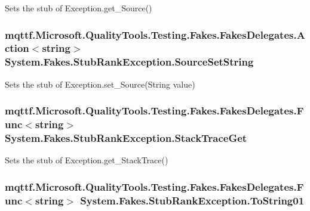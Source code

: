 Sets the stub of Exception.\-get\-\_\-\-Source()

\hypertarget{class_system_1_1_fakes_1_1_stub_rank_exception_a36cd64c088de5c335daa5c4a9218e21d}{
\subsubsection[{Source\-Set\-String}]{\setlength{\rightskip}{0pt plus 5cm}mqttf.\-Microsoft.\-Quality\-Tools.\-Testing.\-Fakes.\-Fakes\-Delegates.\-Action$<$string$>$ System.\-Fakes.\-Stub\-Rank\-Exception.\-Source\-Set\-String}}\label{class_system_1_1_fakes_1_1_stub_rank_exception_a36cd64c088de5c335daa5c4a9218e21d}


Sets the stub of Exception.\-set\-\_\-\-Source(\-String value)

\hypertarget{class_system_1_1_fakes_1_1_stub_rank_exception_aae32a77c0bd8aad21c423ce16c391742}{
\subsubsection[{Stack\-Trace\-Get}]{\setlength{\rightskip}{0pt plus 5cm}mqttf.\-Microsoft.\-Quality\-Tools.\-Testing.\-Fakes.\-Fakes\-Delegates.\-Func$<$string$>$ System.\-Fakes.\-Stub\-Rank\-Exception.\-Stack\-Trace\-Get}}\label{class_system_1_1_fakes_1_1_stub_rank_exception_aae32a77c0bd8aad21c423ce16c391742}


Sets the stub of Exception.\-get\-\_\-\-Stack\-Trace()

\hypertarget{class_system_1_1_fakes_1_1_stub_rank_exception_ae53288720c70de27df1e0390296587a7}{
\subsubsection[{To\-String01}]{\setlength{\rightskip}{0pt plus 5cm}mqttf.\-Microsoft.\-Quality\-Tools.\-Testing.\-Fakes.\-Fakes\-Delegates.\-Func$<$string$>$ System.\-Fakes.\-Stub\-Rank\-Exception.\-To\-String01}}\label{class_system_1_1_fakes_1_1_stub_rank_exception_ae53288720c70de27df1e0390296587a7}


